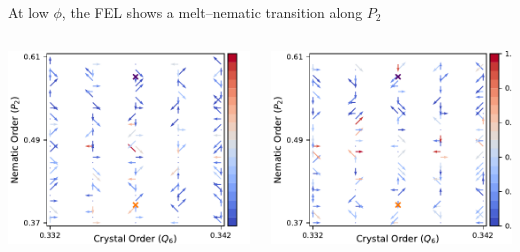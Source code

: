\documentclass[aspectratio=169]{beamer}
\begin{document}
\begin{frame}[c]{At low $\phi$, the FEL shows a melt--nematic transition along $P_{2}$}

  \begin{columns}[T]

    \centering
    \includegraphics[width=\textwidth]{../figures/ch4_jcp/fig-quivers_10p75/fig-U_quiver_10.75.pdf}

    \centering
    \includegraphics[width=\textwidth]{../figures/ch4_jcp/fig-quivers_10p75/fig-mTS_quiver_10.75.pdf}
     
  \end{columns}

\end{frame}
\end{document}
